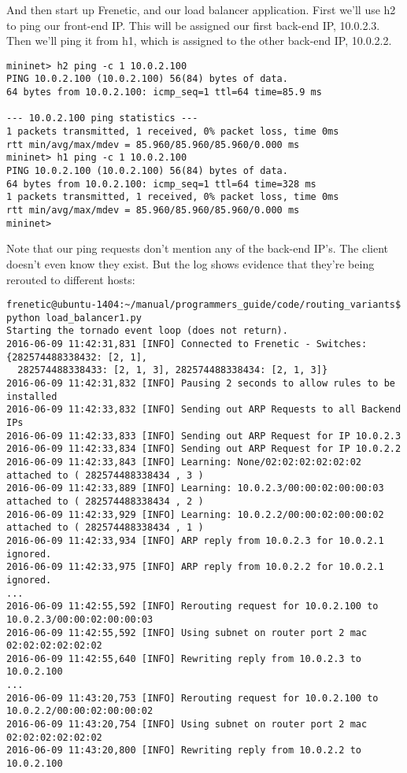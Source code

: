 And then start up Frenetic, and our load balancer application.  
First we'll use h2 to ping our front-end IP.
This will be assigned our first back-end IP, 10.0.2.3.  Then we'll ping it from h1, which is
assigned to the other back-end IP, 10.0.2.2.

\begin{verbatim}
mininet> h2 ping -c 1 10.0.2.100
PING 10.0.2.100 (10.0.2.100) 56(84) bytes of data.
64 bytes from 10.0.2.100: icmp_seq=1 ttl=64 time=85.9 ms

--- 10.0.2.100 ping statistics ---
1 packets transmitted, 1 received, 0% packet loss, time 0ms
rtt min/avg/max/mdev = 85.960/85.960/85.960/0.000 ms
mininet> h1 ping -c 1 10.0.2.100
PING 10.0.2.100 (10.0.2.100) 56(84) bytes of data.
64 bytes from 10.0.2.100: icmp_seq=1 ttl=64 time=328 ms
1 packets transmitted, 1 received, 0% packet loss, time 0ms
rtt min/avg/max/mdev = 85.960/85.960/85.960/0.000 ms
mininet>
\end{verbatim}

Note that our ping requests don't mention any of the back-end IP's.  The client doesn't 
even know they exist.  But the log shows evidence that they're being rerouted to different
hosts:

\begin{verbatim}
frenetic@ubuntu-1404:~/manual/programmers_guide/code/routing_variants$ python load_balancer1.py
Starting the tornado event loop (does not return).
2016-06-09 11:42:31,831 [INFO] Connected to Frenetic - Switches: {282574488338432: [2, 1], 
  282574488338433: [2, 1, 3], 282574488338434: [2, 1, 3]}
2016-06-09 11:42:31,832 [INFO] Pausing 2 seconds to allow rules to be installed
2016-06-09 11:42:33,832 [INFO] Sending out ARP Requests to all Backend IPs
2016-06-09 11:42:33,833 [INFO] Sending out ARP Request for IP 10.0.2.3
2016-06-09 11:42:33,834 [INFO] Sending out ARP Request for IP 10.0.2.2
2016-06-09 11:42:33,843 [INFO] Learning: None/02:02:02:02:02:02 attached to ( 282574488338434 , 3 )
2016-06-09 11:42:33,889 [INFO] Learning: 10.0.2.3/00:00:02:00:00:03 attached to ( 282574488338434 , 2 )
2016-06-09 11:42:33,929 [INFO] Learning: 10.0.2.2/00:00:02:00:00:02 attached to ( 282574488338434 , 1 )
2016-06-09 11:42:33,934 [INFO] ARP reply from 10.0.2.3 for 10.0.2.1 ignored.
2016-06-09 11:42:33,975 [INFO] ARP reply from 10.0.2.2 for 10.0.2.1 ignored.
...
2016-06-09 11:42:55,592 [INFO] Rerouting request for 10.0.2.100 to 10.0.2.3/00:00:02:00:00:03
2016-06-09 11:42:55,592 [INFO] Using subnet on router port 2 mac 02:02:02:02:02:02
2016-06-09 11:42:55,640 [INFO] Rewriting reply from 10.0.2.3 to 10.0.2.100
...
2016-06-09 11:43:20,753 [INFO] Rerouting request for 10.0.2.100 to 10.0.2.2/00:00:02:00:00:02
2016-06-09 11:43:20,754 [INFO] Using subnet on router port 2 mac 02:02:02:02:02:02
2016-06-09 11:43:20,800 [INFO] Rewriting reply from 10.0.2.2 to 10.0.2.100
\end{verbatim}


